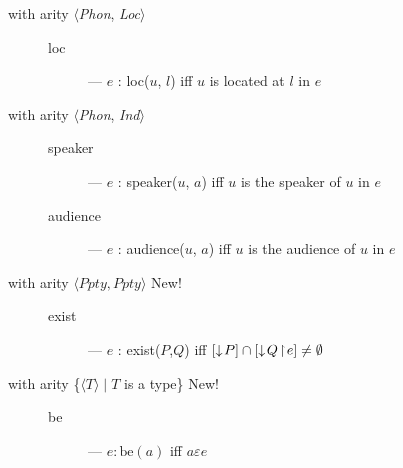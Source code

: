 \begin{description}

  \item[with arity \textnormal{$\langle$\textit{Phon},
    \textit{Loc}$\rangle$}] \mbox{}
  
    \begin{description}

    \item[\textnormal{loc}] --- $e$ : loc($u$, $l$) iff $u$ is located
      at $l$ in $e$

    \end{description}
    
  \item[with arity \textnormal{$\langle$\textit{Phon},
      \textit{Ind}$\rangle$}] \mbox{}

    \begin{description}

    \item[\textnormal{speaker}] --- $e$ : speaker($u$, $a$) iff $u$
        is the speaker of $u$ in $e$

    \item[\textnormal{audience}] --- $e$ : audience($u$, $a$) iff
        $u$ is the audience of $u$ in $e$

    \end{description}

  
\item[with arity
  \textnormal{$\langle\textit{Ppty},\textit{Ppty}\rangle$} New!] \mbox{}

  \begin{description}
    
  \item[\textnormal{exist}] --- $e$ : exist($P$,$Q$) iff
    $[\downarrow\!P]\cap[\downarrow\!Q\!\restriction\! e]\not=\emptyset$

  \end{description}
\item[with arity \textnormal{\{$\langle T\rangle\mid T$ is a type\}} New!]
  \mbox{}

  \begin{description}
    
  \item[\textnormal{be}] --- $e:\text{be}(a)$ iff $a\varepsilon e$

  \end{description}
  

\end{description}


